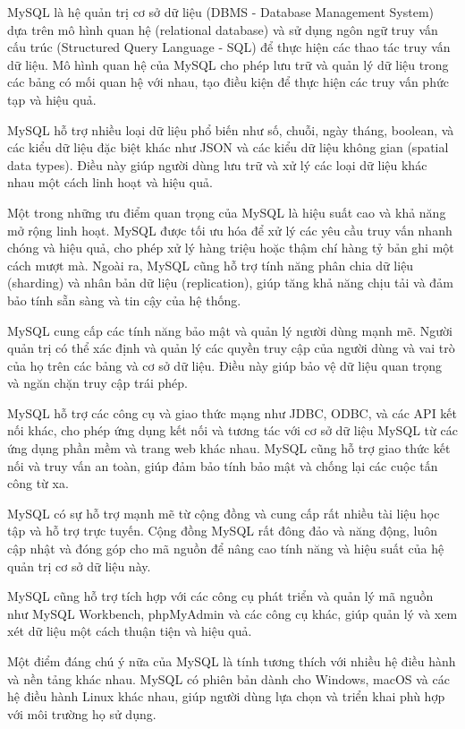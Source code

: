MySQL là hệ quản trị cơ sở dữ liệu (DBMS - Database Management System) dựa trên mô hình quan hệ (relational database) và sử dụng ngôn ngữ truy vấn cấu trúc (Structured Query Language - SQL) để thực hiện các thao tác truy vấn dữ liệu. Mô hình quan hệ của MySQL cho phép lưu trữ và quản lý dữ liệu trong các bảng có mối quan hệ với nhau, tạo điều kiện để thực hiện các truy vấn phức tạp và hiệu quả.

MySQL hỗ trợ nhiều loại dữ liệu phổ biến như số, chuỗi, ngày tháng, boolean, và các kiểu dữ liệu đặc biệt khác như JSON và các kiểu dữ liệu không gian (spatial data types). Điều này giúp người dùng lưu trữ và xử lý các loại dữ liệu khác nhau một cách linh hoạt và hiệu quả.

Một trong những ưu điểm quan trọng của MySQL là hiệu suất cao và khả năng mở rộng linh hoạt. MySQL được tối ưu hóa để xử lý các yêu cầu truy vấn nhanh chóng và hiệu quả, cho phép xử lý hàng triệu hoặc thậm chí hàng tỷ bản ghi một cách mượt mà. Ngoài ra, MySQL cũng hỗ trợ tính năng phân chia dữ liệu (sharding) và nhân bản dữ liệu (replication), giúp tăng khả năng chịu tải và đảm bảo tính sẵn sàng và tin cậy của hệ thống.

MySQL cung cấp các tính năng bảo mật và quản lý người dùng mạnh mẽ. Người quản trị có thể xác định và quản lý các quyền truy cập của người dùng và vai trò của họ trên các bảng và cơ sở dữ liệu. Điều này giúp bảo vệ dữ liệu quan trọng và ngăn chặn truy cập trái phép.

MySQL hỗ trợ các công cụ và giao thức mạng như JDBC, ODBC, và các API kết nối khác, cho phép ứng dụng kết nối và tương tác với cơ sở dữ liệu MySQL từ các ứng dụng phần mềm và trang web khác nhau. MySQL cũng hỗ trợ giao thức kết nối và truy vấn an toàn, giúp đảm bảo tính bảo mật và chống lại các cuộc tấn công từ xa.

MySQL có sự hỗ trợ mạnh mẽ từ cộng đồng và cung cấp rất nhiều tài liệu học tập và hỗ trợ trực tuyến. Cộng đồng MySQL rất đông đảo và năng động, luôn cập nhật và đóng góp cho mã nguồn để nâng cao tính năng và hiệu suất của hệ quản trị cơ sở dữ liệu này.

MySQL cũng hỗ trợ tích hợp với các công cụ phát triển và quản lý mã nguồn như MySQL Workbench, phpMyAdmin và các công cụ khác, giúp quản lý và xem xét dữ liệu một cách thuận tiện và hiệu quả.

Một điểm đáng chú ý nữa của MySQL là tính tương thích với nhiều hệ điều hành và nền tảng khác nhau. MySQL có phiên bản dành cho Windows, macOS và các hệ điều hành Linux khác nhau, giúp người dùng lựa chọn và triển khai phù hợp với môi trường họ sử dụng.

